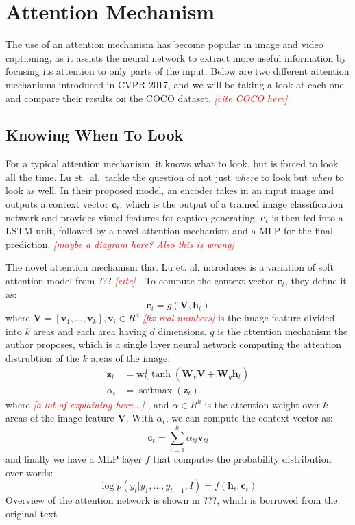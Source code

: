 \documentclass[10pt,twocolumn,letterpaper]{article}
\newcommand{\todo}[1]{\textcolor{red}{{\em [#1]}} }
\newcommand{\matr}[1]{\mathbf{#1}}
\newcommand{\bs}[1]{\boldsymbol{#1}}
\begin{document}
\section{Attention Mechanism}

The use of an attention mechanism has become popular in image and video
captioning, as it assists the neural network to extract more useful
information by focusing its attention to only parts of the input. Below are
two different attention mechanisms introduced in CVPR 2017, and we will be
taking a look at each one and compare their results on the COCO dataset.
\todo{cite COCO here}

\subsection{Knowing When To Look}
For a typical attention mechanism, it knows what to look, but is forced to
look all the time. Lu et.\ al.\ tackle the question of not just \textit{where}
to look but \textit{when} to look as well. In their proposed model, an encoder
takes in an input image and outputs a context vector $\bs{c}_t$, which
is the output of a trained image classification network and provides visual
features for caption generating. $\bs{c}_t$ is then fed into a LSTM
unit, followed by a novel attention mechanism and a MLP for the final
prediction. \todo{maybe a diagram here? Also this is wrong}

The novel attention mechanism that Lu et. al. introduces is a variation of
soft attention model from ??? \todo{cite}. To compute the context vector
$\bs{c}_t$, they define it as:
%
\begin{equation}
  \bs{c}_t = g(\matr{V}, \bs{h}_t)
\end{equation}
%
where $\matr{V} = [\mathbf{v}_1,\dots,\mathbf{v}_k], \mathbf{v}_i \in R^d$
\todo{fix real numbers} is the image feature divided into $k$ areas and each
area having $d$ dimensions. $g$ is the attention mechanism the author
proposes, which is a single layer neural network computing the attention
distrubtion of the $k$ areas of the image:
%
\begin{align}
  \matr{z}_t &= \matr{w}_h^T \tanh(\matr{W}_v \matr{V} + \matr{W}_g \matr{h}_t) \\
  \alpha_t   &= \operatorname{softmax}(\matr{z}_t)
\end{align}
%
where \todo{a lot of explaining here...}, and $\alpha \in R^k$ is the
attention weight over $k$ areas of the image feature $\matr{V}$. With
$\alpha_t$, we can compute the context vector as:
%
\begin{equation}
  \bs{c}_t = \sum_{i=1}^k \alpha_{ti} \bs{v}_{ti}
\end{equation}
%
and finally we have a MLP layer $f$ that computes the probability distribution
over words:
%
\begin{equation}
  \log p(y_t | y_1,\dots,y_{t-1},I) = f(\bs{h}_t, \bs{c}_t)
\end{equation}
%
Overview of the attention network is shown in ???, which is borrowed from the
original text.
\end{document}
